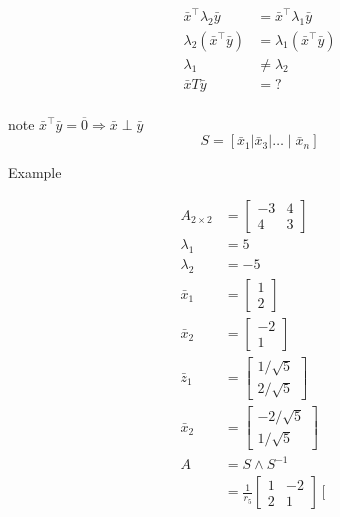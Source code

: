 \documentclass[main.tex]{subfiles}
\begin{document}
    $$
    \begin{aligned}
    \bar{x}^{\top} \lambda_{2} \bar{y} &= \bar{x}^{\top} \lambda_{1} \bar{y} \\
    \lambda_{2}\left(\bar{x}^{\top} \bar{y}\right) &= \lambda_{1} \left(\bar{x}^{\top} \bar{y}\right) \\
    \lambda_{1} &\neq \lambda_{2}\\
    \bar{x} T \bar{y} &=? \\
    \end{aligned}
    $$
    
    note $\bar{x}^{\top} \bar{y}=\overline{0} \Rightarrow \bar{x} \perp \bar{y}$
    $$
    S=\left[\bar{x}_{1}\left|\bar{x}_{3}\right| \ldots \mid \bar{x}_{n}\right]
    $$

    Example

    $$
    \begin{aligned}
    A_{2 \times 2}&=\left[\begin{array}{rr}
    -3 & 4 \\
    4 & 3
    \end{array}\right]\\
    \lambda_1 &= 5\\
    \lambda_2 &= -5\\
    \bar{x}_{1}&=\left[\begin{array}{l}
    1 \\
    2
    \end{array}\right] \\
    \bar{x}_{2}&=\left[\begin{array}{c}
    -2 \\
    1
    \end{array}\right] \\
    \bar{z}_{1}&=\left[\begin{array}{l}
    1 / \sqrt{5} \\
    2 / \sqrt{5}
    \end{array}\right] \\
    \bar{x}_{2}&=\left[\begin{array}{l}
    -2 / \sqrt{5} \\
    1 / \sqrt{5}
    \end{array}\right]\\
    A &= S \wedge S^{-1}\\
    &=\frac{1}{r_{5}}\left[\begin{array}{cc}
    1 & -2 \\
    2 & 1
    \end{array}\right]\left[\begin{array}{cc}

\end{array}
\end{aligned}$$
\end{document}

